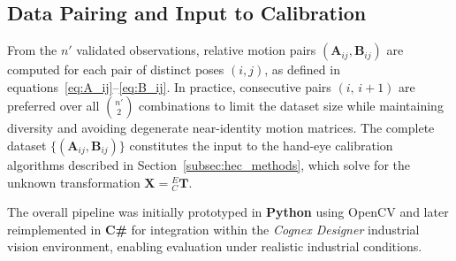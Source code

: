\subsection{Data Pairing and Input to Calibration}
\label{subsec:data_pairing}

From the $n'$ validated observations, relative motion pairs
$(\mathbf{A}_{ij}, \mathbf{B}_{ij})$ are computed for each pair of distinct
poses $(i,j)$, as defined in equations~\eqref{eq:A_ij}--\eqref{eq:B_ij}.
In practice, consecutive pairs $(i,\,i{+}1)$ are preferred over all
$\binom{n'}{2}$ combinations to limit the dataset size while maintaining
diversity and avoiding degenerate near-identity motion matrices. The complete
dataset $\{(\mathbf{A}_{ij}, \mathbf{B}_{ij})\}$ constitutes the input to the
hand-eye calibration algorithms described in Section~\ref{subsec:hec_methods},
which solve for the unknown transformation $\mathbf{X} = {}^E_C\mathbf{T}$.

The overall pipeline was initially prototyped in \textbf{Python} using OpenCV
\cite{bradski2008learning} and later reimplemented in \textbf{C\#} for
integration within the \textit{Cognex Designer} industrial vision environment,
enabling evaluation under realistic industrial conditions.

